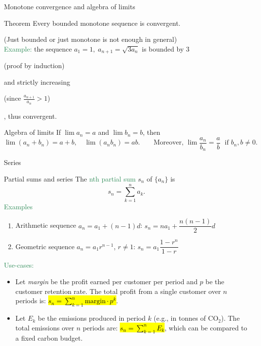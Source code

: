 \documentclass[10pt]{beamer}
\begin{document}
\begin{frame}{Monotone convergence and algebra of limits}
\begin{alertblock}{Theorem}
Every bounded monotone sequence is convergent.	
\end{alertblock}
{\small (Just bounded or just monotone is not enough in general) }\\[3mm]
\textcolor{SeaGreen}{Example:} the sequence $a_1=1, \; a_{n+1}=\sqrt{3a_n}$ is bounded by $3$ \begin{tiny} (proof by induction) \end{tiny} and strictly increasing \begin{tiny} (since $\frac{a_{n+1}}{a_n}>1$)\end{tiny}, thus convergent.\\[3mm]
\begin{block}{Algebra of limits}
If $\lim a_n=a$ and $\lim b_n=b$, then
\[
\lim (a_n+b_n)=a+b,\quad 
\lim (a_n b_n)=ab. \qquad  \mbox{Moreover, }
\lim \frac{a_n}{b_n}=\frac{a}{b} \;\text{ if }b_n,b\neq 0.
\]	
\end{block}
\end{frame}

\begin{frame}{}
	\begin{center}
		\alert{\Huge Series}
	\end{center}
\end{frame}


\begin{frame}{Partial sums and series}
The \textcolor{SeaGreen}{nth partial sum} $s_n$ of $\{a_n\}$ is
\[
s_n=\sum_{k=1}^n a_k.
\]
\textcolor{SeaGreen}{Examples} 
\begin{enumerate}
\item Arithmetic sequence $a_n=a_1+(n-1)d$:\;\;\; $s_n=n a_1+\dfrac{n(n-1)}{2}d$
\item Geometric sequence $a_n=a_1 r^{n-1}$, $r\neq 1$:\;\;\; $s_n=a_1 \dfrac{1-r^n}{1-r}$
\end{enumerate}
\medskip
\textcolor{SeaGreen}{Use-cases:}
\begin{itemize}
\item Let \emph{margin} be the profit earned per customer per period and $p$ be the customer retention rate. The total profit from a single customer over \( n \) periods is: \hl{$s_n = \sum_{k=1}^n \text{margin} \cdot p^k$}.

\item  Let \( E_k \) be the emissions produced in period \( k \) (e.g., in tonnes of CO\(_2\)).  
The total emissions over \( n \) periods are: \hl{$s_n = \sum_{k=1}^n E_k$}, which can be compared to a fixed carbon budget.
\end{itemize}
\end{frame}
\end{document}
